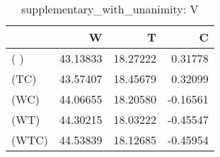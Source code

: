 \begin{table}
\centering
\caption{supplementary_with_unanimity: V}
\begin{tabular}{lrrr}
\toprule
{} &        W &        T &        C \\
\midrule
( )   & 43.13833 & 18.27222 &  0.31778 \\
(TC)  & 43.57407 & 18.45679 &  0.32099 \\
(WC)  & 44.06655 & 18.20580 & -0.16561 \\
(WT)  & 44.30215 & 18.03222 & -0.45547 \\
(WTC) & 44.53839 & 18.12685 & -0.45954 \\
\bottomrule
\end{tabular}
\end{table}
